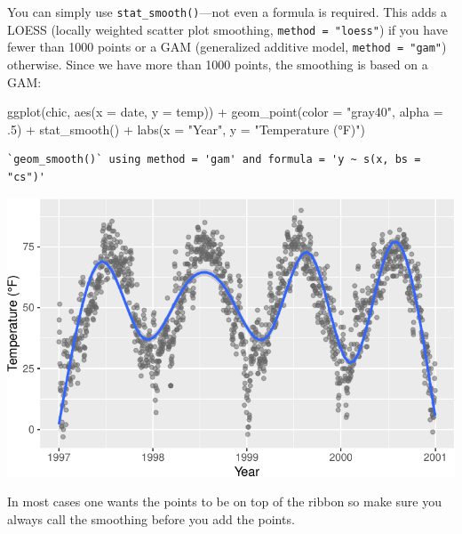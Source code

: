 \documentclass[
  letterpaper,
]{scrbook}
\newenvironment{Shaded}{\begin{snugshade}}{\end{snugshade}}
\newcommand{\AttributeTok}[1]{\textcolor[rgb]{0.40,0.45,0.13}{#1}}
\newcommand{\DecValTok}[1]{\textcolor[rgb]{0.68,0.00,0.00}{#1}}
\newcommand{\FunctionTok}[1]{\textcolor[rgb]{0.28,0.35,0.67}{#1}}
\newcommand{\NormalTok}[1]{\textcolor[rgb]{0.00,0.23,0.31}{#1}}
\newcommand{\SpecialCharTok}[1]{\textcolor[rgb]{0.37,0.37,0.37}{#1}}
\newcommand{\StringTok}[1]{\textcolor[rgb]{0.13,0.47,0.30}{#1}}
\begin{document}
You can simply use \texttt{stat\_smooth()}---not even a formula is
required. This adds a LOESS (locally weighted scatter plot smoothing,
\texttt{method\ =\ "loess"}) if you have fewer than 1000 points or a GAM
(generalized additive model, \texttt{method\ =\ "gam"}) otherwise. Since
we have more than 1000 points, the smoothing is based on a GAM:

\begin{Shaded}
\begin{Highlighting}[]
\FunctionTok{ggplot}\NormalTok{(chic, }\FunctionTok{aes}\NormalTok{(}\AttributeTok{x =}\NormalTok{ date, }\AttributeTok{y =}\NormalTok{ temp)) }\SpecialCharTok{+}
  \FunctionTok{geom\_point}\NormalTok{(}\AttributeTok{color =} \StringTok{"gray40"}\NormalTok{, }\AttributeTok{alpha =}\NormalTok{ .}\DecValTok{5}\NormalTok{) }\SpecialCharTok{+}
  \FunctionTok{stat\_smooth}\NormalTok{() }\SpecialCharTok{+}
  \FunctionTok{labs}\NormalTok{(}\AttributeTok{x =} \StringTok{"Year"}\NormalTok{, }\AttributeTok{y =} \StringTok{"Temperature (°F)"}\NormalTok{) }
\end{Highlighting}
\end{Shaded}

\begin{verbatim}
`geom_smooth()` using method = 'gam' and formula = 'y ~ s(x, bs = "cs")'
\end{verbatim}

\includegraphics{ch17_files/figure-pdf/stat-smooth-1.pdf}

\begin{tcolorbox}[enhanced jigsaw, toprule=.15mm, bottomtitle=1mm, coltitle=black, breakable, colbacktitle=quarto-callout-note-color!10!white, opacityback=0, toptitle=1mm, colframe=quarto-callout-note-color-frame, titlerule=0mm, title=\textcolor{quarto-callout-note-color}{\faInfo}\hspace{0.5em}{Note}, bottomrule=.15mm, arc=.35mm, opacitybacktitle=0.6, leftrule=.75mm, left=2mm, rightrule=.15mm, colback=white]

In most cases one wants the points to be on top of the ribbon so make
sure you always call the smoothing before you add the points.

\end{tcolorbox}
\end{document}
